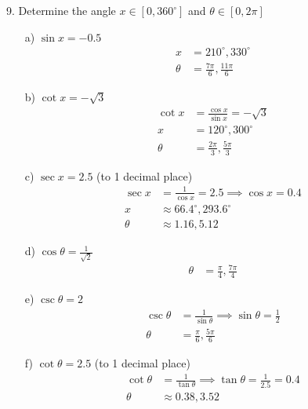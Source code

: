 \documentclass{article}
\begin{document}
9. Determine the angle \( x \in [0, 360^{\circ}] \) and \( \theta \in [0, 2\pi] \)
\begin{enumerate}
    \item[a)] \( \sin x = -0.5 \)
    \begin{align*}
        x &= 210^{\circ}, 330^{\circ} \\
        \theta &= \frac{7\pi}{6}, \frac{11\pi}{6}
    \end{align*}
    \item[b)] \( \cot x = -\sqrt{3} \)
    \begin{align*}
        \cot x &= \frac{\cos x}{\sin x} = -\sqrt{3} \\
        x &= 120^{\circ}, 300^{\circ} \\
        \theta &= \frac{2\pi}{3}, \frac{5\pi}{3}
    \end{align*}
    \item[c)] \( \sec x = 2.5 \) (to 1 decimal place)
    \begin{align*}
        \sec x &= \frac{1}{\cos x} = 2.5 \implies \cos x = 0.4 \\
        x &\approx 66.4^{\circ}, 293.6^{\circ} \\
        \theta &\approx 1.16, 5.12
    \end{align*}
    \item[d)] \( \cos \theta = \frac{1}{\sqrt{2}} \)
    \begin{align*}
        \theta &= \frac{\pi}{4}, \frac{7\pi}{4}
    \end{align*}
    \item[e)] \( \csc \theta = 2 \)
    \begin{align*}
        \csc \theta &= \frac{1}{\sin \theta} \implies \sin \theta = \frac{1}{2} \\
        \theta &= \frac{\pi}{6}, \frac{5\pi}{6}
    \end{align*}
    \item[f)] \( \cot \theta = 2.5 \) (to 1 decimal place)
    \begin{align*}
        \cot \theta &= \frac{1}{\tan \theta} \implies \tan \theta = \frac{1}{2.5} = 0.4 \\
        \theta &\approx 0.38, 3.52
    \end{align*}
\end{enumerate}
\end{document}
